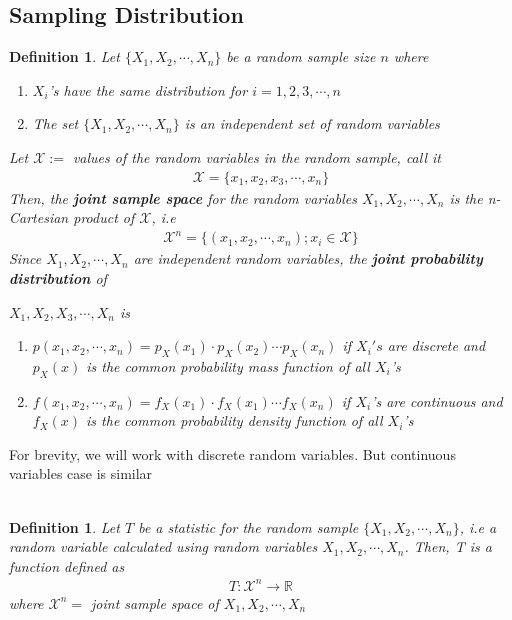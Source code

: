 \documentclass[11pt,oneside]{book}
\theoremstyle{newStyle}
\newtheorem{defn}[thm]{Definition}
\newcommand{\R}{\mathbb{R}}
\newcommand{\X}{\mathcal{X}}
\begin{document}
\subsection[Sampling Distribution]{Sampling Distribution}
\begin{defn}
Let $\{X_1,X_2,\cdots,X_n\}$ be a random sample size $n$ where \begin{enumerate}[itemsep=0pt, topsep=1pt, partopsep=0pt,label=(\roman*)]
\item $X_i$'s have the same distribution for $i=1,2,3,\cdots,n$
\item The set $\{X_1,X_2,\cdots,X_n\}$ is an independent set of random variables
\end{enumerate}
Let $\X:=$ values of the random variables in the random sample, call it \begin{align*}
\X=\{x_1,x_2,x_3,\cdots,x_n\}
\end{align*} 
Then, the \textbf{joint sample space} for the random variables $X_1,X_2,\cdots,X_n$ is the n-Cartesian product of $\X$, i.e \begin{align*}
\X^n=\{(x_1,x_2,\cdots,x_n);x_i\in \X\}
\end{align*}
Since $X_1,X_2,\cdots,X_n$ are independent random variables, the \textbf{joint probability distribution} of

 $X_1,X_2,X_3,\cdots,X_n$ is \begin{enumerate}
\item $p(x_1,x_2,\cdots,x_n)=p_X(x_1)\cdot p_X(x_2)\cdots p_X(x_n)$ if $X_i's$ are discrete and $p_X(x)$ is the common probability mass function of all $X_i$'s
\item $f(x_1,x_2,\cdots,x_n)=f_X(x_1)\cdot f_X(x_1)\cdots f_X(x_n)$ if $X_i$'s are continuous and $f_X(x)$ is the common probability density function of all $X_i$'s
\end{enumerate}
\end{defn}
For brevity, we will work with discrete random variables. But continuous variables case is similar\\
\hfill\\
\begin{defn}
Let $T$ be a statistic for the random sample $\{X_1,X_2,\cdots,X_n\}$, i.e a random variable calculated using random variables $X_1,X_2,\cdots,X_n$. Then, T is a function defined as \begin{align*}
T:\mathcal{X}^n\longrightarrow \R
\end{align*}
where $\X^n=$ joint sample space of 
$X_1,X_2,\cdots,X_n$
\end{defn}
\end{document}
